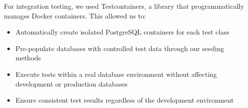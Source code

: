 For integration testing, we used Testcontainers\cite{testcontainers}, a library that programmatically manages Docker containers. This allowed us to:
\begin{itemize}
  \item Automatically create isolated PostgreSQL containers for each test class
  \item Pre-populate databases with controlled test data through our seeding methods
  \item Execute tests within a real database environment without affecting development or production databases
  \item Ensure consistent test results regardless of the development environment
\end{itemize}




